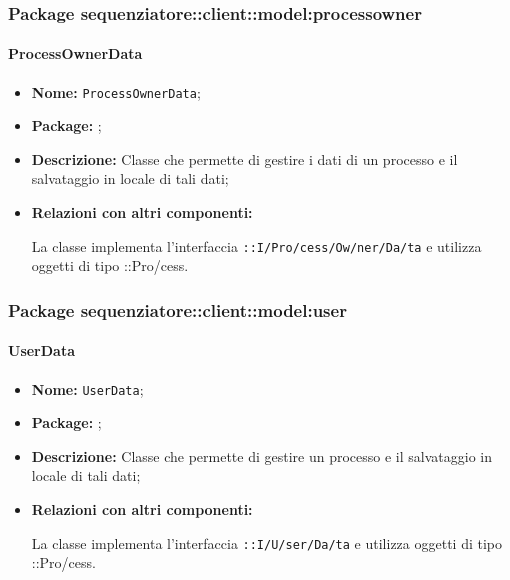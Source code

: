 \subsubsection{Package sequenziatore::client::model:processowner}
\paragraph{ProcessOwnerData}
\begin{flushleft}
\begin{itemize}
\item \textbf{Nome:} \texttt{ProcessOwnerData};
\item \textbf{Package:} \texttt{\modelAdmin{}};
\item \textbf{Descrizione:} Classe che permette di gestire i dati di un processo e il salvataggio in locale di tali dati;
\item \textbf{Relazioni con altri componenti:}
\begin{sloppypar}
La classe implementa l'interfaccia \texttt{\iModelAdmin{}::I\fshyp{}Pro\fshyp{}cess\fshyp{}Ow\fshyp{}ner\fshyp{}Da\fshyp{}ta} e utilizza oggetti di tipo \texttt{\model{}}::Pro\fshyp{}cess.
\end{sloppypar}
\end{itemize}
\end{flushleft}

\subsubsection{Package sequenziatore::client::model:user}
\paragraph{UserData}
\begin{flushleft}
\begin{itemize}
\item \textbf{Nome:} \texttt{UserData};
\item \textbf{Package:} \texttt{\modelUser{}};
\item \textbf{Descrizione:} Classe che permette di gestire un processo e il salvataggio in locale di tali dati;
\item \textbf{Relazioni con altri componenti:}
\begin{sloppypar}
La classe implementa l'interfaccia \texttt{\iModelUser{}::I\fshyp{}U\fshyp{}ser\fshyp{}Da\fshyp{}ta} e utilizza oggetti di tipo \texttt{\model{}}::Pro\fshyp{}cess.
\end{sloppypar}
\end{itemize}
\end{flushleft}